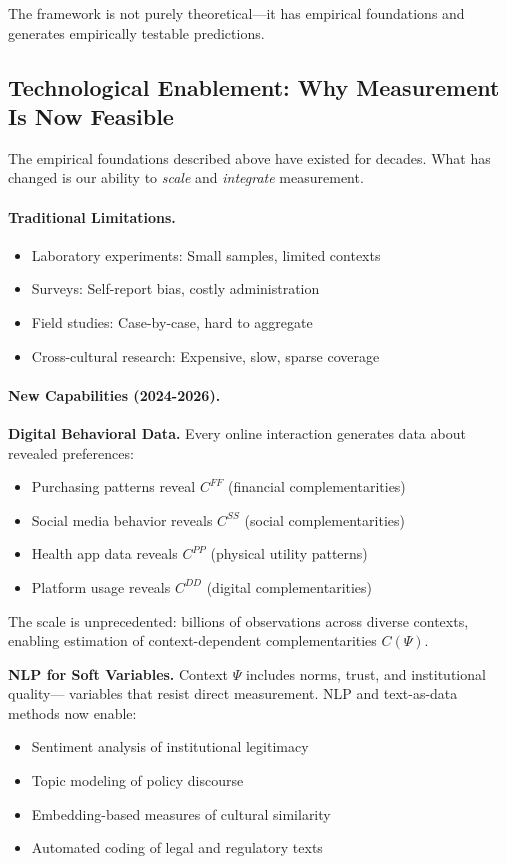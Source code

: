 The framework is not purely theoretical---it has empirical foundations
and generates empirically testable predictions.

\subsection{Technological Enablement: Why Measurement Is Now Feasible}

The empirical foundations described above have existed for decades.
What has changed is our ability to \emph{scale} and \emph{integrate} measurement.

\paragraph{Traditional Limitations.}
\begin{itemize}
  \item Laboratory experiments: Small samples, limited contexts
  \item Surveys: Self-report bias, costly administration
  \item Field studies: Case-by-case, hard to aggregate
  \item Cross-cultural research: Expensive, slow, sparse coverage
\end{itemize}

\paragraph{New Capabilities (2024-2026).}

\textbf{Digital Behavioral Data.}
Every online interaction generates data about revealed preferences:
\begin{itemize}
  \item Purchasing patterns reveal $C^{FF}$ (financial complementarities)
  \item Social media behavior reveals $C^{SS}$ (social complementarities)
  \item Health app data reveals $C^{PP}$ (physical utility patterns)
  \item Platform usage reveals $C^{DD}$ (digital complementarities)
\end{itemize}

The scale is unprecedented: billions of observations across diverse contexts,
enabling estimation of context-dependent complementarities $C(\Psi)$.

\textbf{NLP for Soft Variables.}
Context $\Psi$ includes norms, trust, and institutional quality---
variables that resist direct measurement. NLP and text-as-data methods \citep{gentzkow2019} now enable:
\begin{itemize}
  \item Sentiment analysis of institutional legitimacy
  \item Topic modeling of policy discourse
  \item Embedding-based measures of cultural similarity
  \item Automated coding of legal and regulatory texts
\end{itemize}

